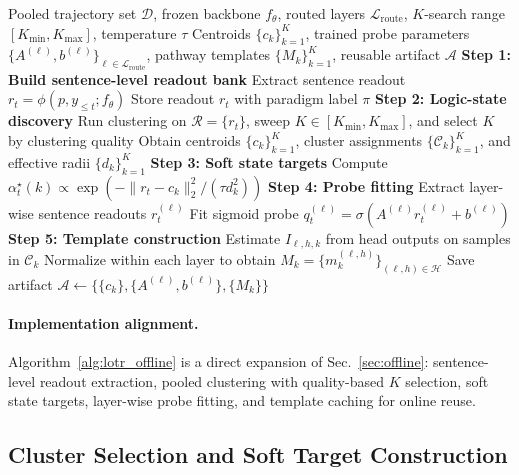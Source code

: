 \begin{algorithm}[t]
\caption{LoTR Offline Compilation}
\label{alg:lotr_offline}
\begin{algorithmic}[1]
\REQUIRE Pooled trajectory set \(\mathcal{D}\), frozen backbone \(f_\theta\), routed layers \(\mathcal{L}_{\mathrm{route}}\), \(K\)-search range \([K_{\min},K_{\max}]\), temperature \(\tau\)
\ENSURE Centroids \(\{c_k\}_{k=1}^K\), trained probe parameters \(\{A^{(\ell)},b^{(\ell)}\}_{\ell\in\mathcal{L}_{\mathrm{route}}}\), pathway templates \(\{M_k\}_{k=1}^K\), reusable artifact \(\mathcal{A}\)
\STATE \textbf{Step 1: Build sentence-level readout bank}
    \STATE Extract sentence readout \(r_t=\phi(p,y_{\le t};f_\theta)\)
    \STATE Store readout \(r_t\) with paradigm label \(\pi\)
\ENDFOR
\STATE \textbf{Step 2: Logic-state discovery}
\STATE Run clustering on \(\mathcal{R}=\{r_t\}\), sweep \(K\in[K_{\min},K_{\max}]\), and select \(K\) by clustering quality
\STATE Obtain centroids \(\{c_k\}_{k=1}^K\), cluster assignments \(\{\mathcal{C}_k\}_{k=1}^K\), and effective radii \(\{d_k\}_{k=1}^K\)
\STATE \textbf{Step 3: Soft state targets}
    \STATE Compute \(\alpha_t^\star(k)\propto\exp(-\|r_t-c_k\|_2^2/(\tau d_k^2))\)
\ENDFOR
\STATE \textbf{Step 4: Probe fitting}
    \STATE Extract layer-wise sentence readouts \(r_t^{(\ell)}\)
    \STATE Fit sigmoid probe \(q_t^{(\ell)}=\sigma(A^{(\ell)}r_t^{(\ell)}+b^{(\ell)})\)
\ENDFOR
\STATE \textbf{Step 5: Template construction}
    \STATE Estimate \(I_{\ell,h,k}\) from head outputs on samples in \(\mathcal{C}_k\)
    \STATE Normalize within each layer to obtain \(M_k=\{m_k^{(\ell,h)}\}_{(\ell,h)\in\mathcal{H}}\)
\ENDFOR
\STATE Save artifact \(\mathcal{A}\leftarrow\{\{c_k\},\{A^{(\ell)},b^{(\ell)}\},\{M_k\}\}\)
\end{algorithmic}
\end{algorithm}

\paragraph{Implementation alignment.}
Algorithm~\ref{alg:lotr_offline} is a direct expansion of Sec.~\ref{sec:offline}: sentence-level readout extraction, pooled clustering with quality-based \(K\) selection, soft state targets, layer-wise probe fitting, and template caching for online reuse.

\subsection{Cluster Selection and Soft Target Construction}
\label{app:alg_offline_cluster}

